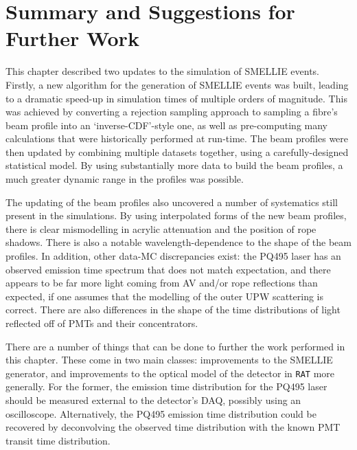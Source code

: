 

\section{Summary and Suggestions for Further Work}
This chapter described two updates to the simulation of SMELLIE events. Firstly, a new algorithm for the generation of SMELLIE events was built, leading to a dramatic speed-up in simulation times of multiple orders of magnitude. This was achieved by converting a rejection sampling approach to sampling a fibre's beam profile into an `inverse-CDF'-style one, as well as pre-computing many calculations that were historically performed at run-time. The beam profiles were then updated by combining multiple datasets together, using a carefully-designed statistical model. By using substantially more data to build the beam profiles, a much greater dynamic range in the profiles was possible.

The updating of the beam profiles also uncovered a number of systematics still present in the simulations. By using interpolated forms of the new beam profiles, there is clear mismodelling in acrylic attenuation and the position of rope shadows. There is also a notable wavelength-dependence to the shape of the beam profiles. In addition, other data-MC discrepancies exist: the PQ495 laser has an observed emission time spectrum that does not match expectation, and there appears to be far more light coming from AV and/or rope reflections than expected, if one assumes that the modelling of the outer UPW scattering is correct. There are also differences in the shape of the time distributions of light reflected off of PMTs and their concentrators.

There are a number of things that can be done to further the work performed in this chapter. These come in two main classes: improvements to the SMELLIE generator, and improvements to the optical model of the detector in \texttt{RAT} more generally. For the former, the emission time distribution for the PQ495 laser should be measured external to the detector's DAQ, possibly using an oscilloscope. Alternatively, the PQ495 emission time distribution could be recovered by deconvolving the observed time distribution with the known PMT transit time distribution.

